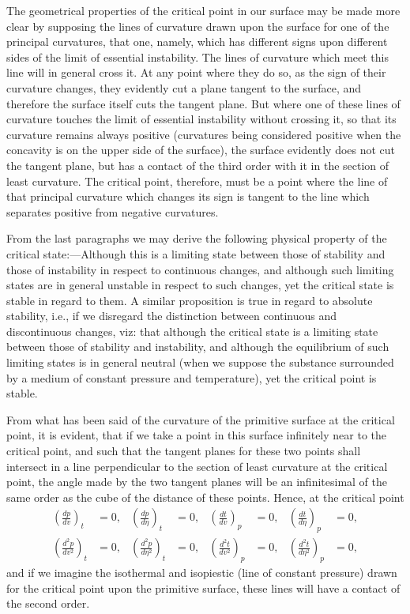\documentclass[11pt]{article}
\begin{document}
The geometrical properties of the critical point in our surface may be made more clear by supposing the lines of curvature drawn upon the surface for one of the principal curvatures, that one, namely, which has different signs upon different sides of the limit of essential instability. The lines of curvature which meet this line will in general cross it. At any point where they do so, as the sign of their curvature changes, they evidently cut a plane tangent to the surface, and therefore the surface itself cuts the tangent plane. But where one of these lines of curvature touches the limit of essential instability without crossing it, so that its curvature remains always positive (curvatures being considered positive when the concavity is on the upper side of the surface), the surface evidently does not cut the tangent plane, but has a contact of the third order with it in the section of least curvature. The critical point, therefore, must be a point where the line of that principal curvature which changes its sign is tangent to the line which separates positive from negative curvatures.

From the last paragraphs we may derive the following physical property of the critical state:---Although this is a limiting state between those of stability and those of instability in respect to continuous changes, and although such limiting states are in general unstable in respect to such changes, yet the critical state is stable in regard to them. A similar proposition is true in regard to absolute stability, i.e., if we disregard the distinction between continuous and discontinuous changes, viz: that although the critical state is a limiting state between those of stability and instability, and although the equilibrium of such limiting states is in general neutral (when we suppose the substance surrounded by a medium of constant pressure and temperature), yet the critical point is stable.

From what has been said of the curvature of the primitive surface at the critical point, it is evident, that if we take a point in this surface infinitely near to the critical point, and such that the tangent planes for these two points shall intersect in a line perpendicular to the section of least curvature at the critical point, the angle made by the two tangent planes will be an infinitesimal of the same order as the cube of the distance of these points. Hence, at the critical point
\begin{align*}
\left(\frac{dp}{dv}\right)_t&=0,&
\left(\frac{dp}{d\eta}\right)_t&=0,&
\left(\frac{dt}{dv}\right)_p&=0,&
\left(\frac{dt}{d\eta}\right)_p&=0,\\[0.35em]
\left(\frac{d^2p}{dv^2}\right)_t&=0,&
\left(\frac{d^2p}{d\eta^2}\right)_t&=0,&
\left(\frac{d^2t}{dv^2}\right)_p&=0,&
\left(\frac{d^2t}{d\eta^2}\right)_p&=0,
\end{align*}
and if we imagine the isothermal and isopiestic (line of constant pressure) drawn for the critical point upon the primitive surface, these lines will have a contact of the second order.
\end{document}
